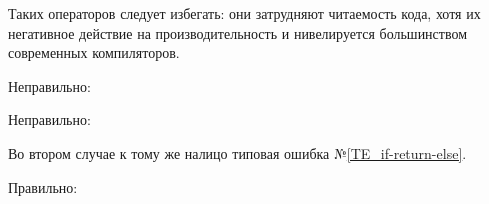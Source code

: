 \begin{typerror}
	\label{TE_if-return-return}

	Таких операторов следует избегать: они затрудняют читаемость кода,
	хотя их негативное действие на производительность и нивелируется большинством современных компиляторов.

	Неправильно:

	Неправильно:

	Во втором случае к тому же налицо типовая ошибка №\ref{TE_if-return-else}.

	Правильно:

	
\end{typerror}
